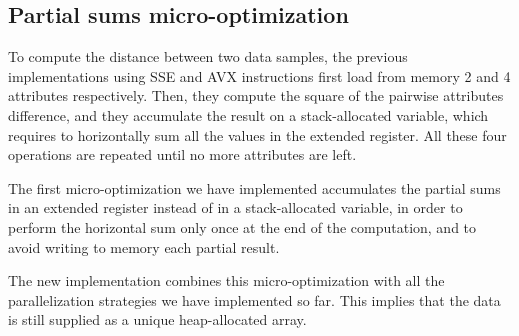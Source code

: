 \documentclass{article}
\begin{document}

\vspace{-20pt}

\hypertarget{micro-optimization-partial-sum}{%
\subsection{Partial sums micro-optimization}\label{micro-optimization-partial-sum}}

To compute the distance between two data samples, the previous implementations using SSE and AVX instructions first load from memory 2 and 4 attributes respectively. Then, they compute the square of the pairwise attributes difference, and they accumulate the result on a stack-allocated variable, which requires to horizontally sum all the values in the extended register.
All these four operations are repeated until no more attributes are left.

The first micro-optimization we have implemented accumulates the partial sums in an
extended register instead of in a
stack-allocated variable, in order to perform the horizontal sum only once at the end of the computation, and to avoid writing to memory each partial result.

The new implementation combines this micro-optimization with all the parallelization strategies we have implemented so far.
This implies that the data is still supplied as a unique heap-allocated array.
\end{document}

